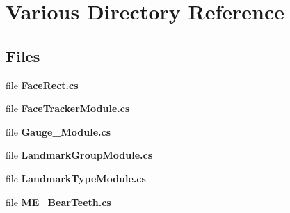\section{Various Directory Reference}
\label{dir_e8c363fb7e9433430a1e246a40d2768a}
\subsection*{Files}
\begin{DoxyCompactItemize}
\item 
file \textbf{ Face\+Rect.\+cs}
\item 
file \textbf{ Face\+Tracker\+Module.\+cs}
\item 
file \textbf{ Gauge\+\_\+\+Module.\+cs}
\item 
file \textbf{ Landmark\+Group\+Module.\+cs}
\item 
file \textbf{ Landmark\+Type\+Module.\+cs}
\item 
file \textbf{ M\+E\+\_\+\+Bear\+Teeth.\+cs}
\end{DoxyCompactItemize}
